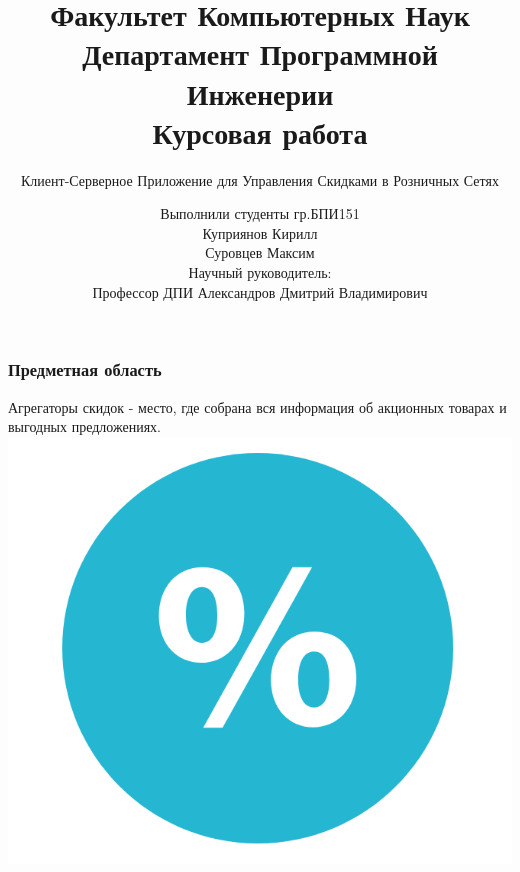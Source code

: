 \documentclass{beamer}
\title[Заголовок]{\footnotesize Факультет Компьютерных Наук\\Департамент
Программной Инженерии\\Курсовая работа}
\subtitle{Клиент-Серверное Приложение для Управления Скидками в Розничных Сетях}
\author[Куприянов К.И., Суровцев М.А.]{\scriptsize Выполнили студенты
гр.БПИ151\\Куприянов Кирилл\\Суровцев Максим\\Научный руководитель:\\Профессор
ДПИ Александров Дмитрий Владимирович}
\institute[Высшая школа экономики]{}
\date{\the\year}
\begin{document}
\frame[plain]{
    \maketitle
}



\begin{frame}
\frametitle{Предметная область}
	\begin{multicols}{2}
        Агрегаторы скидок - место, где собрана вся информация об акционных товарах и выгодных предложениях.
		\columnbreak
		\medskip
		\includegraphics[width=\columnwidth]{skidka.png}
	\end{multicols}
\end{frame}
\end{document}
